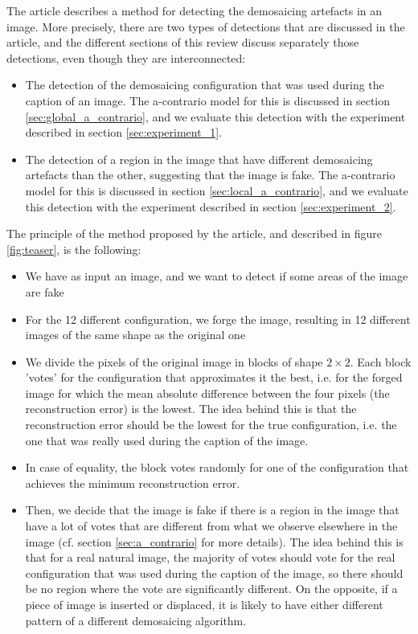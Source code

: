 \documentclass[sigconf, nonacm]{acmart}
\begin{document}
The article describes a method for detecting the demosaicing artefacts in an image. More precisely, there are two types of detections that are discussed in the article, and the different sections of this review discuss separately those detections, even though they are interconnected:

\begin{itemize}
    \item The detection of the demosaicing configuration that was used during the caption of an image. The a-contrario model for this is discussed in section \ref{sec:global_a_contrario}, and we evaluate this detection with the experiment described in section \ref{sec:experiment_1}.
    \item The detection of a region in the image that have different demosaicing artefacts than the other, suggesting that the image is fake. The a-contrario model for this is discussed in section \ref{sec:local_a_contrario}, and we evaluate this detection with the experiment described in section \ref{sec:experiment_2}.
\end{itemize}

The principle of the method proposed by the article, and described in figure \ref{fig:teaser}, is the following:

\begin{itemize}
    \item We have as input an image, and we want to detect if some areas of the image are fake
    \item For the 12 different configuration, we forge the image, resulting in 12 different images of the same shape as the original one
    \item We divide the pixels of the original image in blocks of shape $2 \times 2$. Each block 'votes' for the configuration that approximates it the best, i.e. for the forged image for which the mean absolute difference between the four pixels (the reconstruction error) is the lowest. The idea behind this is that the reconstruction error should be the lowest for the true configuration, i.e. the one that was really used during the caption of the image.
    \item In case of equality, the block votes randomly for one of the configuration that achieves the minimum reconstruction error.
    \item Then, we decide that the image is fake if there is a region in the image that have a lot of votes that are different from what we observe elsewhere in the image (cf. section \ref{sec:a_contrario} for more details). The idea behind this is that for a real natural image, the majority of votes should vote for the real configuration that was used during the caption of the image, so there should be no region where the vote are significantly different. On the opposite, if a piece of image is inserted or displaced, it is likely to have either different pattern of a different demosaicing algorithm.
\end{itemize}
\end{document}
